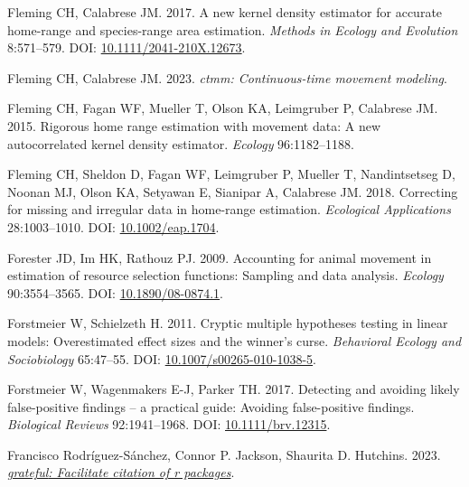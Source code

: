 \documentclass[10pt,a4paper]{article}
\newlength{\cslhangindent}
\newlength{\cslentryspacingunit} %
\newenvironment{CSLReferences}[2] %
 {%
  \setlength{\parindent}{0pt}
  \ifodd #1
  \let\oldpar\par
  \def\par{\hangindent=\cslhangindent\oldpar}
  \fi
  \setlength{\parskip}{#2\cslentryspacingunit}
 }%
 {}
\begin{document}
\begin{CSLReferences}{1}{0}
\leavevmode{}%
Fleming CH, Calabrese JM. 2017. A new kernel density estimator for accurate home-range and species-range area estimation. \emph{Methods in Ecology and Evolution} 8:571--579. DOI: \href{https://doi.org/10.1111/2041-210X.12673}{10.1111/2041-210X.12673}.

\leavevmode{}%
Fleming CH, Calabrese JM. 2023. \emph{{ctmm}: Continuous-time movement modeling}.

\leavevmode{}%
Fleming CH, Fagan WF, Mueller T, Olson KA, Leimgruber P, Calabrese JM. 2015. Rigorous home range estimation with movement data: {A} new autocorrelated kernel density estimator. \emph{Ecology} 96:1182--1188.

\leavevmode{}%
Fleming CH, Sheldon D, Fagan WF, Leimgruber P, Mueller T, Nandintsetseg D, Noonan MJ, Olson KA, Setyawan E, Sianipar A, Calabrese JM. 2018. Correcting for missing and irregular data in home-range estimation. \emph{Ecological Applications} 28:1003--1010. DOI: \href{https://doi.org/10.1002/eap.1704}{10.1002/eap.1704}.

\leavevmode{}%
Forester JD, Im HK, Rathouz PJ. 2009. Accounting for animal movement in estimation of resource selection functions: Sampling and data analysis. \emph{Ecology} 90:3554--3565. DOI: \href{https://doi.org/10.1890/08-0874.1}{10.1890/08-0874.1}.

\leavevmode{}%
Forstmeier W, Schielzeth H. 2011. Cryptic multiple hypotheses testing in linear models: Overestimated effect sizes and the winner's curse. \emph{Behavioral Ecology and Sociobiology} 65:47--55. DOI: \href{https://doi.org/10.1007/s00265-010-1038-5}{10.1007/s00265-010-1038-5}.

\leavevmode{}%
Forstmeier W, Wagenmakers E-J, Parker TH. 2017. Detecting and avoiding likely false-positive findings -- a practical guide: {Avoiding} false-positive findings. \emph{Biological Reviews} 92:1941--1968. DOI: \href{https://doi.org/10.1111/brv.12315}{10.1111/brv.12315}.

\leavevmode{}%
Francisco Rodríguez-Sánchez, Connor P. Jackson, Shaurita D. Hutchins. 2023. \emph{\href{https://github.com/Pakillo/grateful}{{grateful}: Facilitate citation of r packages}}.


\end{CSLReferences}
\end{document}
